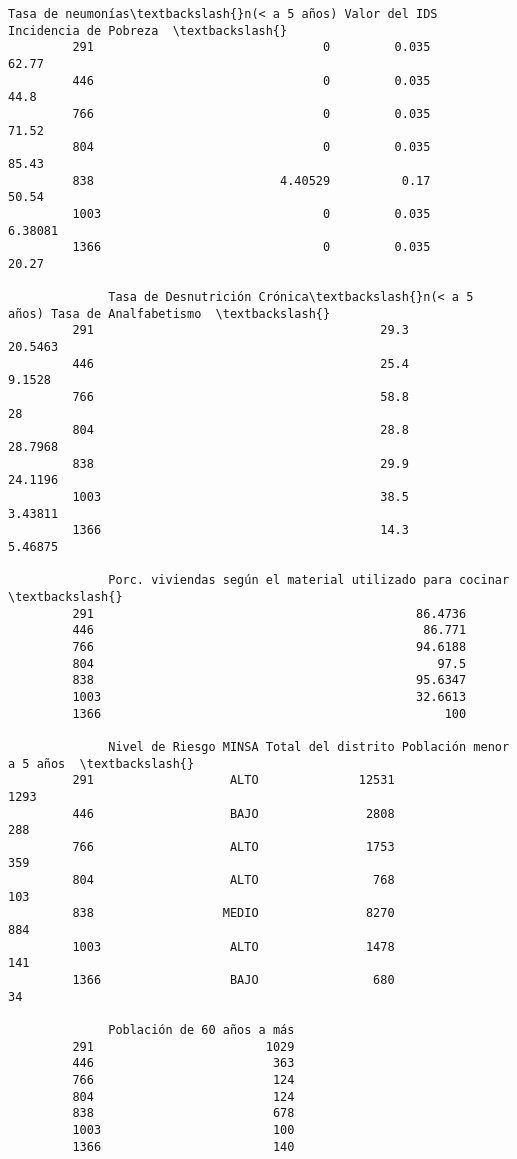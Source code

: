 \documentclass[11pt]{article}
\begin{document}
\begin{Verbatim}[commandchars=\\\{\}]
              Tasa de neumonías\textbackslash{}n(< a 5 años) Valor del IDS Incidencia de Pobreza  \textbackslash{}
         291                                0         0.035                 62.77   
         446                                0         0.035                  44.8   
         766                                0         0.035                 71.52   
         804                                0         0.035                 85.43   
         838                          4.40529          0.17                 50.54   
         1003                               0         0.035               6.38081   
         1366                               0         0.035                 20.27   
         
              Tasa de Desnutrición Crónica\textbackslash{}n(< a 5 años) Tasa de Analfabetismo  \textbackslash{}
         291                                        29.3               20.5463   
         446                                        25.4                9.1528   
         766                                        58.8                    28   
         804                                        28.8               28.7968   
         838                                        29.9               24.1196   
         1003                                       38.5               3.43811   
         1366                                       14.3               5.46875   
         
              Porc. viviendas según el material utilizado para cocinar   \textbackslash{}
         291                                             86.4736          
         446                                              86.771          
         766                                             94.6188          
         804                                                97.5          
         838                                             95.6347          
         1003                                            32.6613          
         1366                                                100          
         
              Nivel de Riesgo MINSA Total del distrito Población menor a 5 años  \textbackslash{}
         291                   ALTO              12531                     1293   
         446                   BAJO               2808                      288   
         766                   ALTO               1753                      359   
         804                   ALTO                768                      103   
         838                  MEDIO               8270                      884   
         1003                  ALTO               1478                      141   
         1366                  BAJO                680                       34   
         
              Población de 60 años a más  
         291                        1029  
         446                         363  
         766                         124  
         804                         124  
         838                         678  
         1003                        100  
         1366                        140  
\end{Verbatim}
            
\end{document}

